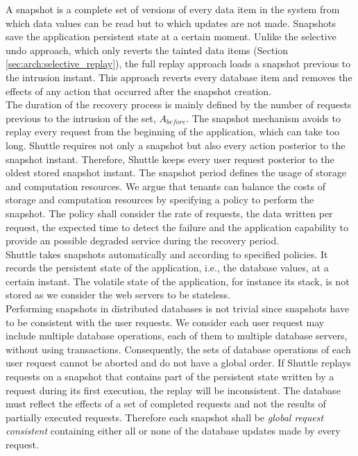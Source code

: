 A snapshot is a complete set of versions of every data item in the system from which data values can be read but to which updates are not made. Snapshots save the application persistent state at a certain moment. Unlike the selective undo approach, which only reverts the tainted data items (Section \ref{sec:arch:selective_replay}), the full replay approach loads a snapshot previous to the intrusion instant. This approach reverts every database item and removes the effects of any action that occurred after the snapshot creation. \\

The duration of the recovery process is mainly defined by the number of requests previous to the intrusion of the set, $A_{before}$. The snapshot mechanism avoids to replay every request from the beginning of the application, which can take too long. Shuttle requires not only a snapshot but also every action posterior to the snapshot instant. Therefore, Shuttle keeps every user request posterior to the oldest stored snapshot instant. The snapshot period defines the usage of storage and computation resources. We argue that tenants can balance the costs of storage and computation resources by specifying a policy to perform the snapshot. The policy shall consider the rate of requests, the data written per request, the expected time to detect the failure and the application capability to provide an possible degraded service during the recovery period. \\

Shuttle takes snapshots automatically and according to specified policies. It records the persistent state of the application, i.e., the database values, at a certain instant. The volatile state of the application, for instance its stack, is not stored as we consider the web servers to be stateless. \\


Performing snapshots in distributed databases is not trivial since snapshots have to be consistent with the user requests.  We consider each user request may include multiple database operations, each of them to multiple database servers, without using transactions. Consequently, the sets of database operations of each user request cannot be aborted and do not have a global order. If Shuttle replays requests on a snapshot that contains part of the persistent state written by a request during its first execution, the replay will be inconsistent. The database must reflect the effects of a set of completed requests and not the results of partially executed requests. Therefore each snapshot shall be \emph{global request consistent} containing either all or none of the database updates made by every request.


